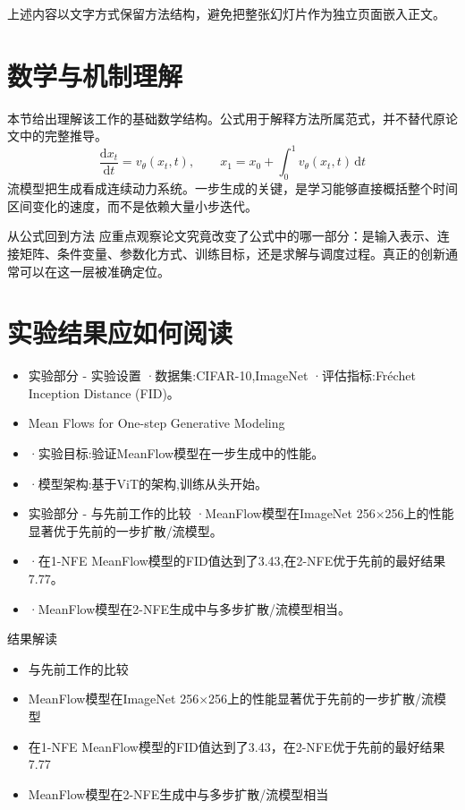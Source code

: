 \documentclass[UTF8,11pt,a4paper]{ctexart}
\begin{document}
上述内容以文字方式保留方法结构，避免把整张幻灯片作为独立页面嵌入正文。

\section{数学与机制理解}
本节给出理解该工作的基础数学结构。公式用于解释方法所属范式，并不替代原论文中的完整推导。
\begin{equation}
\frac{\mathrm d x_t}{\mathrm d t}=v_\theta(x_t,t),\qquad x_1=x_0+\int_0^1 v_\theta(x_t,t)\,\mathrm dt
\end{equation}
流模型把生成看成连续动力系统。一步生成的关键，是学习能够直接概括整个时间区间变化的速度，而不是依赖大量小步迭代。

\begin{keybox}{从公式回到方法}
应重点观察论文究竟改变了公式中的哪一部分：是输入表示、连接矩阵、条件变量、参数化方式、训练目标，还是求解与调度过程。真正的创新通常可以在这一层被准确定位。
\end{keybox}


\section{实验结果应如何阅读}
\begin{itemize}
\item 实验部分 - 实验设置 ·数据集:CIFAR-10,ImageNet ·评估指标:Fréchet Inception Distance (FID)。
\item Mean Flows for One-step Generative Modeling
\item ·实验目标:验证MeanFlow模型在一步生成中的性能。
\item ·模型架构:基于ViT的架构,训练从头开始。
\item 实验部分 - 与先前工作的比较 ·MeanFlow模型在ImageNet 256×256上的性能显著优于先前的一步扩散/流模型。
\item ·在1-NFE MeanFlow模型的FID值达到了3.43,在2-NFE优于先前的最好结果7.77。
\item ·MeanFlow模型在2-NFE生成中与多步扩散/流模型相当。
\end{itemize}

\begin{notebox}{结果解读}
\begin{itemize}
\item 与先前工作的比较
\item MeanFlow模型在ImageNet 256×256上的性能显著优于先前的一步扩散/流模型
\item 在1-NFE MeanFlow模型的FID值达到了3.43，在2-NFE优于先前的最好结果7.77
\item MeanFlow模型在2-NFE生成中与多步扩散/流模型相当
\end{itemize}
\end{notebox}
\end{document}
